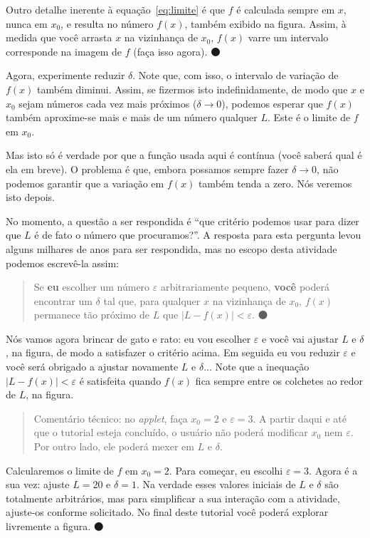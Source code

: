 \documentclass[fleqn,12pt]{scrartcl}
\newenvironment{ct}{\begin{quotation}\color{red!30!black}\sffamily\small Comentário técnico: }{\end{quotation}} %
\newcommand\foreign[1]{\textsl{#1}}
\newcommand\proceed{\textcolor{green!50!black}{$\medbullet$}\xspace}
\begin{document}
    Outro detalhe inerente à equação~\ref{eq:limite} é que $f$ é calculada sempre em $x$, nunca em $x_0$, e resulta no número $f(x)$, também exibido na figura. Assim, à medida que você arrasta $x$ na vizinhança de $x_0$, $f(x)$ varre um intervalo corresponde na imagem de $f$ (faça isso agora). \proceed

    Agora, experimente reduzir $\delta$. Note que, com isso, o intervalo de variação de $f(x)$ também diminui. Assim, se fizermos isto indefinidamente, de modo que $x$ e $x_0$ sejam números cada vez mais próximos ($\delta \to 0$), podemos esperar que $f(x)$ também aproxime-se mais e mais de um número qualquer $L$. Este é o limite de $f$ em $x_0$.

    Mas isto só é verdade por que a função usada aqui é contínua (você saberá qual é ela em breve). O problema é que, embora possamos sempre fazer $\delta \to 0$, não podemos garantir que a variação em $f(x)$ também tenda a zero. Nós veremos isto depois.

    No momento, a questão a ser respondida é ``que critério podemos usar para dizer que $L$ é de fato o número que procuramos?''. A resposta para esta pergunta levou alguns milhares de anos para ser respondida, mas no escopo desta atividade podemos escrevê-la assim:

    \begin{quotation}
	Se \textbf{eu} escolher um número $\varepsilon$ arbitrariamente pequeno, \textbf{você} poderá encontrar um $\delta$ tal que, para qualquer $x$ na vizinhança de $x_0$, $f(x)$ permanece tão próximo de $L$ que $|L - f(x)| < \varepsilon$. \proceed
    \end{quotation}

    Nós vamos agora brincar de gato e rato: eu vou escolher $\varepsilon$ e você vai ajustar $L$ e $\delta$, na figura, de modo a satisfazer o critério acima. Em seguida eu vou reduzir $\varepsilon$ e você será obrigado a ajustar novamente $L$ e $\delta$... Note que a inequação $|L - f(x)| < \varepsilon$ é satisfeita quando $f(x)$ fica sempre entre os colchetes ao redor de $L$, na figura.

    \begin{ct}
	no \foreign{applet}, faça $x_0 = 2$ e $\varepsilon = 3$. A partir daqui e até que o tutorial esteja concluído, o usuário não poderá modificar $x_0$ nem $\varepsilon$. Por outro lado, ele poderá mexer em $L$ e $\delta$.
    \end{ct}

    Calcularemos o limite de $f$ em $x_0 = 2$. Para começar, eu escolhi $\varepsilon = 3$. Agora é a sua vez: ajuste $L = 20$ e $\delta = 1$. Na verdade esses valores iniciais de $L$ e $\delta$ são totalmente arbitrários, mas para simplificar a sua interação com a atividade, ajuste-os conforme solicitado. No final deste tutorial você poderá explorar livremente a figura. \proceed
\end{document}
